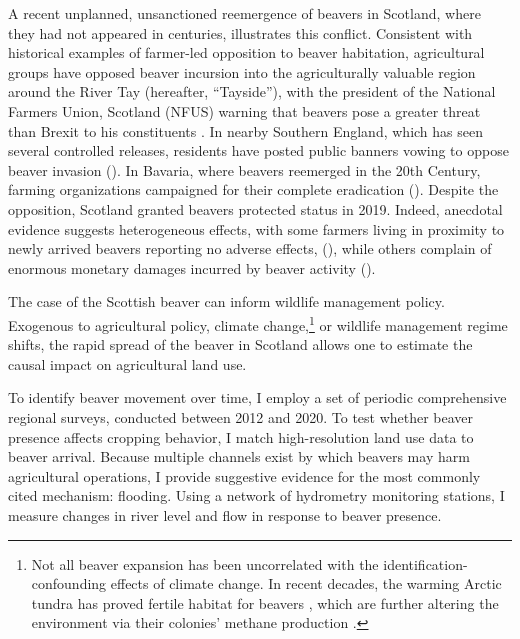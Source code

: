 A recent unplanned, unsanctioned reemergence of beavers in Scotland, where they had not appeared in centuries, illustrates this conflict. Consistent with historical examples of farmer-led opposition to beaver habitation, agricultural groups have opposed beaver incursion into the agriculturally valuable region around the River Tay (hereafter, ``Tayside''), with the president of the National Farmers Union, Scotland (NFUS) warning that beavers pose a greater threat than Brexit to his constituents \citep{castle_beavers_2021}. In nearby Southern England, which has seen several controlled releases, residents have posted public banners vowing to oppose beaver invasion (\cite{itooksomephotos_say_2022}).  In Bavaria, where beavers reemerged in the 20th Century, farming organizations campaigned for their complete eradication (\cite{campbell-palmer_managing_2015}). Despite the opposition, Scotland granted beavers protected status in 2019. Indeed, anecdotal evidence suggests heterogeneous effects, with some farmers living in proximity to newly arrived beavers reporting no adverse effects, (\cite{campbell_rd_naturescot_2012}), while others complain of enormous monetary damages incurred by beaver activity (\cite{hamilton_tayside_2015}).

The case of the Scottish beaver can inform wildlife management policy. Exogenous to agricultural policy, climate change,\footnote{Not all beaver expansion has been uncorrelated with the identification-confounding effects of climate change. In recent decades, the warming Arctic tundra has proved fertile habitat for beavers \citep{tape_expanding_2022}, which are further altering the environment via their colonies' methane production \citep{clark_beaver_2023}.} or wildlife management regime shifts, the rapid spread of the beaver in Scotland  allows one to estimate the causal impact on agricultural land use.

To identify beaver movement over time, I employ a set of periodic comprehensive regional surveys, conducted between 2012 and 2020. To test whether beaver presence affects cropping behavior, I match high-resolution land use data to beaver arrival. Because multiple channels exist by which beavers may harm agricultural operations, I provide suggestive evidence for the most commonly cited mechanism: flooding. Using a network of hydrometry monitoring stations, I measure changes in river level and flow in response to beaver presence.

